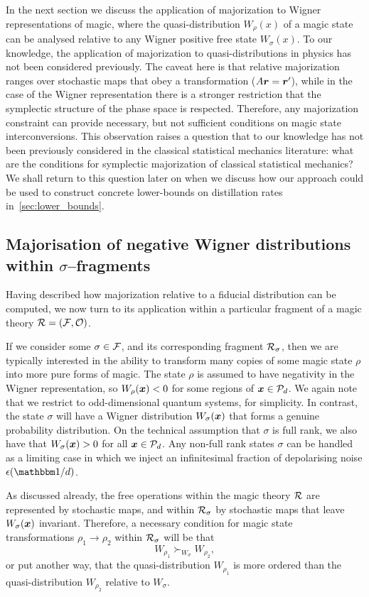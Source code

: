 \documentclass[pra,
aps,
twocolumn,
superscriptaddress,
groupedaddress,
nofootinbib,
reprint
]{revtex4-1}
\begin{document}
In the next section we discuss the application of majorization to Wigner representations of magic, where the quasi-distribution $W_\rho(x)$ of a magic state can be analysed relative to any Wigner positive free state $W_\sigma(x)$. To our knowledge, the application of majorization to quasi-distributions in  physics has not been considered previously. The caveat here is that relative majorization ranges over stochastic maps that obey a transformation ($A\boldsymbol{r} = \boldsymbol{r}'$), while in the case of the Wigner representation there is a stronger restriction that the symplectic structure of the phase space is respected. Therefore, any majorization constraint can provide necessary, but not sufficient conditions on magic state interconversions. This observation raises a question that to our knowledge has not been previously considered in the classical statistical mechanics literature: what are the conditions for symplectic majorization of classical statistical mechanics? We shall return to this question later on when we discuss how our approach could be used to construct concrete lower-bounds on distillation rates in~\cref{sec:lower_bounds}.

\subsection{Majorisation of negative Wigner distributions within $\sigma$--fragments}
\label{sec:major_frag}

Having described how majorization relative to a fiducial distribution can be computed, we now turn to its application within a particular fragment of a magic theory ${\mathcal R}= ({\mathcal F}, {\mathcal O})$.

If we consider some $\sigma \in {\mathcal F}$, and its corresponding fragment ${\mathcal R}_\sigma$, then we are typically interested in the ability to transform many copies of some magic state $\rho$ into more pure forms of magic. The state $\rho$ is assumed to have negativity in the Wigner representation, so $W_\rho(\boldsymbol{x}) < 0$ for some regions of $\boldsymbol{x} \in {\mathcal P}_d$. We again note that we restrict to odd-dimensional quantum systems, for simplicity. In contrast, the state $\sigma$ will have a Wigner distribution $W_\sigma(\boldsymbol{x})$ that forms a genuine probability distribution. On the technical assumption that $\sigma$ is full rank, we also have that $W_\sigma(\boldsymbol{x}) > 0$ for all $\boldsymbol{x} \in {\mathcal P}_d$. Any non-full rank states $\sigma$ can be handled as a limiting case in which we inject an infinitesimal fraction of depolarising noise $\epsilon (\id/d)$.

As discussed already, the free operations within the magic theory ${\mathcal R}$ are represented by stochastic maps, and within ${\mathcal R}_\sigma$ by stochastic maps that leave $W_\sigma(\boldsymbol{x})$ invariant. Therefore, a necessary condition for magic state transformations $\rho_1 \rightarrow \rho_2$ within ${\mathcal R}_\sigma$ will be that 
\begin{equation}
	W_{\rho_1} \succ_{W_{\sigma}} W_{\rho_2},
\end{equation}
or put another way, that the quasi-distribution $W_{\rho_1}$ is more ordered than the quasi-distribution $W_{\rho_2}$ relative to $W_\sigma$.
\end{document}
